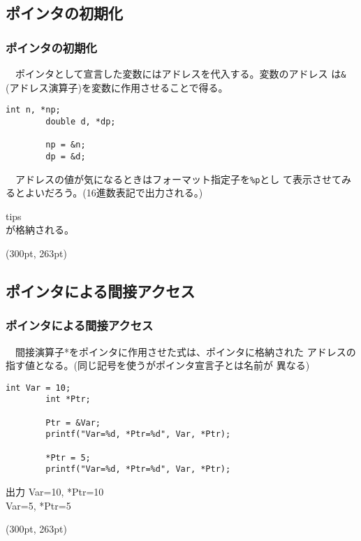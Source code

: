 \documentclass[dvipdfmx]{beamer}
\begin{document}
\subsection{ポインタの初期化}
\begin{frame}[t, fragile]
    \frametitle{ポインタの初期化}
    　ポインタとして宣言した変数にはアドレスを代入する。変数のアドレス
    は\verb|&|(アドレス演算子)を変数に作用させることで得る。
    \begin{lstlisting}[gobble=8, caption=Example\space of\space Pointer\space Initialization]
        int n, *np;
        double d, *dp;

        np = &n;
        dp = &d;
    \end{lstlisting}
    　アドレスの値が気になるときはフォーマット指定子を\texttt{\%p}とし
    て表示させてみるとよいだろう。(16進数表記で出力される。)
    \begin{itembox}[l]{tips}
        \\
        が格納される。
    \end{itembox}
    \begin{textblock*}{0.3\linewidth}(300pt, 263pt)
        \space
    \end{textblock*}
\end{frame}

\subsection{ポインタによる間接アクセス}
\begin{frame}[t, fragile]
    \frametitle{ポインタによる間接アクセス}
    　間接演算子*をポインタに作用させた式は、ポインタに格納された
    アドレスの指す値となる。(同じ記号を使うがポインタ宣言子とは名前が
    異なる)
    \begin{lstlisting}[gobble=8, caption=Pointer\space Example]
        int Var = 10;
        int *Ptr;

        Ptr = &Var;
        printf("Var=%d, *Ptr=%d", Var, *Ptr);

        *Ptr = 5;
        printf("Var=%d, *Ptr=%d", Var, *Ptr);
    \end{lstlisting}
    \begin{block}{出力}
        Var=10, *Ptr=10\\
        Var=5, *Ptr=5
    \end{block}
    \begin{textblock*}{0.3\linewidth}(300pt, 263pt)
        \space
    \end{textblock*}
\end{frame}
\end{document}
